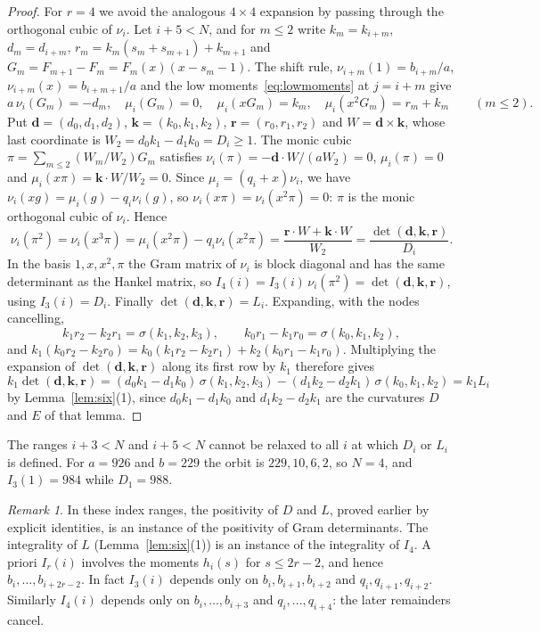 \documentclass[11pt]{article}
\theoremstyle{definition}
\theoremstyle{remark}
\newtheorem{remark}[theorem]{Remark}
\begin{document}
\begin{proof}
For $r=4$ we avoid the analogous $4\times4$ expansion by passing through the
orthogonal cubic of $\nu_i$. Let $i+5<N$, and for $m\le2$ write
$k_m=k_{i+m}$, $d_m=d_{i+m}$, $r_m=k_m(s_m+s_{m+1})+k_{m+1}$ and
$G_m=F_{m+1}-F_m=F_m(x)(x-s_m-1)$. The shift rule, $\nu_{i+m}(1)=b_{i+m}/a$,
$\nu_{i+m}(x)=b_{i+m+1}/a$ and the low moments~\eqref{eq:lowmoments} at
$j=i+m$ give
\[
 a\,\nu_i(G_m)=-d_m,\quad \mu_i(G_m)=0,\quad \mu_i(xG_m)=k_m,\quad
 \mu_i(x^2G_m)=r_m+k_m\qquad(m\le2).
\]
Put $\mathbf d=(d_0,d_1,d_2)$, $\mathbf k=(k_0,k_1,k_2)$,
$\mathbf r=(r_0,r_1,r_2)$ and $W=\mathbf d\times\mathbf k$, whose last
coordinate is $W_2=d_0k_1-d_1k_0=D_i\ge1$. The monic cubic
$\pi=\sum_{m\le2}(W_m/W_2)G_m$ satisfies $\nu_i(\pi)=-\mathbf d\cdot W/(aW_2)=0$,
$\mu_i(\pi)=0$ and $\mu_i(x\pi)=\mathbf k\cdot W/W_2=0$. Since
$\mu_i=(q_i+x)\nu_i$, we have $\nu_i(xg)=\mu_i(g)-q_i\nu_i(g)$, so
$\nu_i(x\pi)=\nu_i(x^2\pi)=0$: $\pi$ is the monic orthogonal cubic of $\nu_i$.
Hence
\[
 \nu_i(\pi^2)=\nu_i(x^3\pi)=\mu_i(x^2\pi)-q_i\nu_i(x^2\pi)
 =\frac{\mathbf r\cdot W+\mathbf k\cdot W}{W_2}
 =\frac{\det(\mathbf d,\mathbf k,\mathbf r)}{D_i}.
\]
In the basis $1,x,x^2,\pi$ the Gram matrix of $\nu_i$ is block diagonal and has
the same determinant as the Hankel matrix, so
$I_4(i)=I_3(i)\,\nu_i(\pi^2)=\det(\mathbf d,\mathbf k,\mathbf r)$, using
$I_3(i)=D_i$.
Finally $\det(\mathbf d,\mathbf k,\mathbf r)=L_i$. Expanding, with the nodes
cancelling,
\[
 k_1r_2-k_2r_1=\sigma(k_1,k_2,k_3),\qquad k_0r_1-k_1r_0=\sigma(k_0,k_1,k_2),
\]
and $k_1(k_0r_2-k_2r_0)=k_0(k_1r_2-k_2r_1)+k_2(k_0r_1-k_1r_0)$. Multiplying
the expansion of $\det(\mathbf d,\mathbf k,\mathbf r)$ along its first row by
$k_1$ therefore gives
\[
 k_1\det(\mathbf d,\mathbf k,\mathbf r)
 =(d_0k_1-d_1k_0)\,\sigma(k_1,k_2,k_3)-(d_1k_2-d_2k_1)\,\sigma(k_0,k_1,k_2)
 =k_1L_i
\]
by Lemma~\ref{lem:six}(1), since $d_0k_1-d_1k_0$ and $d_1k_2-d_2k_1$ are the
curvatures $D$ and $E$ of that lemma.
\end{proof}

The ranges $i+3<N$ and $i+5<N$ cannot be relaxed to all $i$ at which $D_i$ or $L_i$ is defined.
For $a=926$ and $b=229$ the orbit is $229,10,6,2$, so $N=4$, and $I_3(1)=984$ while $D_1=988$.

\begin{remark}
In these index ranges, the positivity of $D$ and $L$, proved earlier by explicit identities, is an instance of the
positivity of Gram determinants. The integrality of $L$ (Lemma~\ref{lem:six}(1)) is an instance
of the integrality of $I_4$. A priori $I_r(i)$ involves the moments $h_i(s)$ for $s\le2r-2$,
and hence $b_i,\dots,b_{i+2r-2}$. In fact $I_3(i)$ depends only on $b_i,b_{i+1},b_{i+2}$ and
$q_i,q_{i+1},q_{i+2}$. Similarly $I_4(i)$ depends only on $b_i,\dots,b_{i+3}$ and
$q_i,\dots,q_{i+4}$: the later remainders cancel.
\end{remark}
\end{document}
